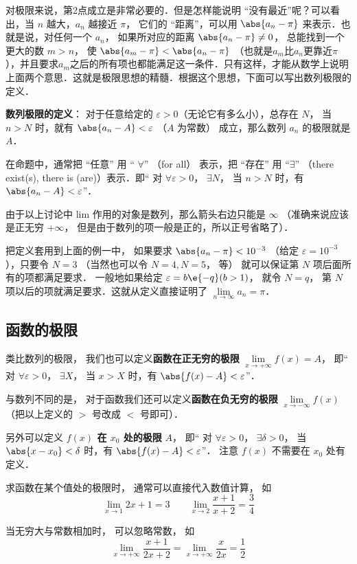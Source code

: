 对极限来说，第2点成立是非常必要的．但是怎样能说明 “没有最近”呢？可以看出，当 $n$ 越大，$a_n$ 越接近 $\pi$， 它们的 “距离”，可以用 $\abs{a_n - \pi}$ 来表示．也就是说，对任何一个 $a_n$， 如果所对应的距离 $\abs{a_n - \pi } \ne 0$， 总能找到一个更大的数 $m>n$， 使 $\abs{a_m - \pi} < \abs{a_n - \pi}$ （也就是$a_m$比$a_n$更靠近$\pi$），并且要求$a_m$之后的所有项也都能满足这一条件．只有这样，才能从数学上说明上面两个意思．这就是极限思想的精髓．根据这个思想，下面可以写出数列极限的定义．

\textbf{数列极限的定义}： 对于任意给定的 $\varepsilon > 0$（无论它有多么小），总存在 $N$， 当 $n>N$ 时，就有 $\abs{a_n - A} < \varepsilon$ （$A$ 为常数） 成立，那么数列 $a_n$ 的极限就是 $A$． 

在命题中，通常把 “任意” 用 “ $\forall$” （for all） 表示，把 “存在” 用 “$\exists $” （there exist(s), there is (are)）表示．即“ 对 $\forall \varepsilon>0$， $\exists N$， 当 $n>N$ 时，有 $\abs{a_n - A} < \varepsilon$”． 

由于以上讨论中 lim 作用的对象是数列，那么箭头右边只能是 $\infty$ （准确来说应该是正无穷 $+\infty$， 但是由于数列的项一般是正的，所以正号省略了）．

把定义套用到上面的例一中， 如果要求 $\abs{a_n - \pi} < 10^{-3}$ （给定 $\varepsilon  = 10^{-3}$），只要令 $N=3$ （当然也可以令 $N=4, N=5$， 等） 就可以保证第 $N$ 项后面所有的项都满足要求． 一般地如果给定 $\varepsilon  = b\e{-q}  (b > 1)$， 就令 $N = q$， 第 $N$ 项以后的项就满足要求．这就从定义直接证明了 $\lim\limits_{n \to \infty } a_n = \pi$． 

\subsection{函数的极限}
类比数列的极限， 我们也可以定义\textbf{函数在正无穷的极限} $\lim\limits_{x\to +\infty} f(x) = A$， 即“ 对 $\forall \varepsilon > 0$， $\exists X$， 当 $x>X$ 时，有 $\abs{f(x) - A} < \varepsilon$”．

与数列不同的是， 对于函数我们还可以定义\textbf{函数在负无穷的极限} $\lim\limits_{x\to -\infty} f(x)$（把以上定义的 $>$ 号改成 $<$ 号即可）．

另外可以定义 \textbf{$f(x)$ 在 $x_0$ 处的极限} $A$， 即“ 对 $\forall \varepsilon > 0$， $\exists \delta > 0$， 当 $\abs{x - x_0} < \delta$ 时，有 $\abs{f(x) - A} < \varepsilon$”． 注意 $f(x)$ 不需要在 $x_0$ 处有定义．

\begin{example}{}
求函数在某个值处的极限时， 通常可以直接代入数值计算， 如
\begin{equation}
\lim_{x\to 1} 2x + 1 = 3 \qquad \lim_{x\to 2}\frac{x + 1}{x + 2} = \frac34
\end{equation}

当无穷大与常数相加时， 可以忽略常数， 如
\begin{equation}
\lim_{x\to +\infty} \frac{x + 1}{2x + 2} = \lim_{x\to +\infty} \frac{x}{2x} = \frac12
\end{equation}
\end{example}

